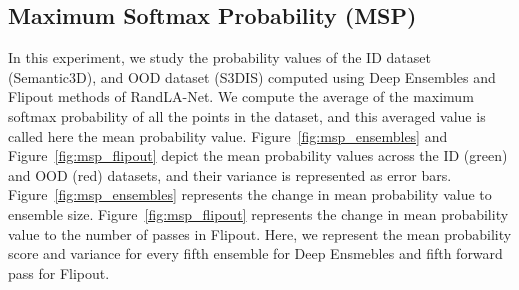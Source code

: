     \subsection{Maximum Softmax Probability (MSP)}
    \label{sec:prob_sem3dvs3dis}
    In this experiment, we study the probability values of the ID dataset (Semantic3D), and OOD dataset (S3DIS) computed using Deep Ensembles and Flipout methods of RandLA-Net.
    We compute the average of the maximum softmax probability of all the points in the dataset, and this averaged value is called here the mean probability value.
    Figure~\ref{fig:msp_ensembles} and Figure~\ref{fig:msp_flipout} depict the mean probability values across the ID (green) and OOD (red) datasets, and their variance is represented as error bars.
    Figure~\ref{fig:msp_ensembles} represents the change in mean probability value to ensemble size.
    Figure~\ref{fig:msp_flipout} represents the change in mean probability value to the number of passes in Flipout.
    Here, we represent the mean probability score and variance for every fifth ensemble for Deep Ensmebles and fifth forward pass for Flipout.
